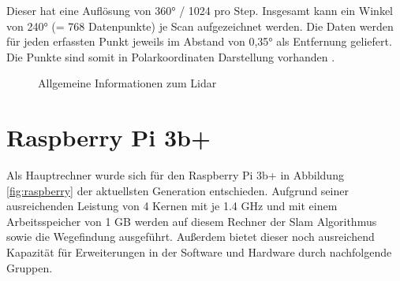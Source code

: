 Dieser hat eine Auflösung von 360° / 1024 pro Step. Insgesamt kann ein Winkel von 240° (= 768 Datenpunkte) je Scan aufgezeichnet werden. Die Daten werden für jeden erfassten Punkt jeweils im Abstand von 0,35° als Entfernung geliefert. Die Punkte sind somit in Polarkoordinaten Darstellung vorhanden \cite{hokuyo.2018}.


\begin{figure}[htbp]
  \caption{Allgemeine Informationen zum Lidar}
  \vspace{1cm}
\end{figure}








\section{Raspberry Pi 3b+}

Als Hauptrechner wurde sich für den Raspberry Pi 3b+ in Abbildung \ref{fig:raspberry} der aktuellsten Generation entschieden. Aufgrund seiner ausreichenden Leistung von 4 Kernen mit je 1.4 GHz und mit einem Arbeitsspeicher von 1 GB werden auf diesem Rechner der Slam Algorithmus sowie die Wegefindung ausgeführt. Außerdem bietet dieser noch ausreichend Kapazität für Erweiterungen in der Software und Hardware durch nachfolgende Gruppen.  



